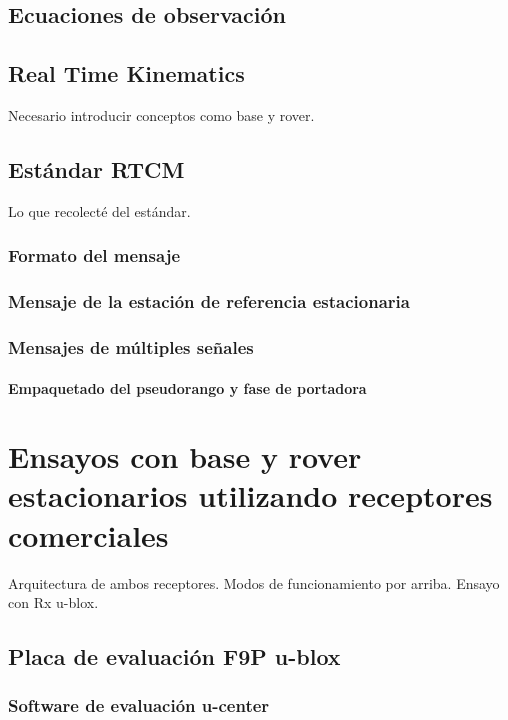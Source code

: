 \documentclass[a4paper,12pt,oneside,onecolumn,final,openright]{book}%
\begin{document}
\section{Ecuaciones de observación}
\section{Real Time Kinematics}
Necesario introducir conceptos como base y rover.
\section{Estándar RTCM}
Lo que recolecté del estándar.
\subsection{Formato del mensaje}
\subsection{Mensaje de la estación de referencia estacionaria}
\subsection{Mensajes de múltiples señales}
\subsubsection{Empaquetado del pseudorango y fase de portadora}
\chapter{Ensayos con base y rover estacionarios utilizando receptores comerciales}
Arquitectura de ambos receptores. Modos de funcionamiento por arriba. Ensayo con Rx u-blox.
\section{Placa de evaluación F9P u-blox}
\subsection{Software de evaluación u-center}
\end{document}
